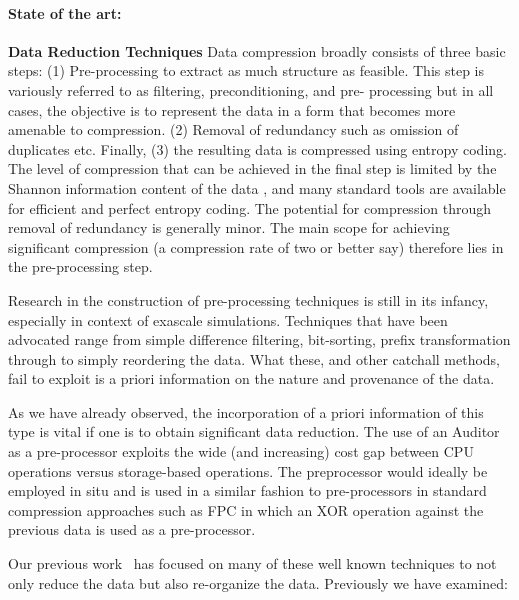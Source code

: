 \paragraph{State of the art:} {\bf Data Reduction Techniques} Data compression
broadly consists of three basic steps: (1) Pre-processing to extract as much
structure as feasible. This step is variously referred to as filtering,
preconditioning, and pre- processing but in all cases, the objective is to
represent the data in a form that becomes more amenable to compression.  (2)
Removal of redundancy such as omission of duplicates etc.  Finally, (3) the
resulting data is compressed using entropy coding. The level of compression
that can be achieved in the final step is limited by the Shannon information
content of the data \cite{Gray:book}, and many standard tools are available for
efficient and perfect entropy coding. The potential for compression through
removal of redundancy is generally minor. The main scope for achieving
significant compression (a compression rate of two or better say) therefore
lies in the pre-processing step.

Research in the construction of pre-processing techniques is still in its
infancy, especially in context of exascale simulations. Techniques that have
been advocated range from simple difference filtering, bit-sorting, prefix
transformation through to simply reordering the data.  What these, and other
catchall methods, fail to exploit is a priori information on the nature and
provenance of the data.

As we have already observed, the incorporation of a priori information of this
type is vital if one is to obtain significant data reduction. The use of an
Auditor as a pre-processor exploits the wide (and increasing) cost gap between
CPU operations versus storage-based operations. The preprocessor would ideally
be employed in situ and is used in a similar fashion to pre-processors in
standard compression approaches such as FPC \cite{BurtscherFPC} in which an XOR
operation against the previous data is used as a pre-processor.

Our previous
work~\cite{lakshminarasimhan2011compressing,lakshminarasimhan2011compressing,%
gong2012multi,jenkins2012byte,gong2013parlo,boyuka2014transparent,%
tang2014improving}
has focused on many of these well known techniques to not only reduce the data
but also re-organize the data. Previously we have examined:


